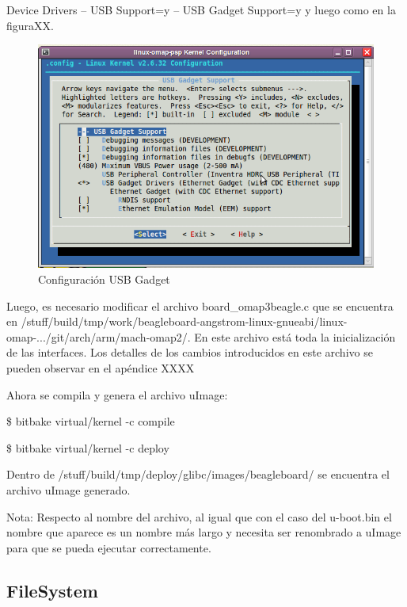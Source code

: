 Device Drivers – USB Support=y – USB Gadget Support=y y luego como en la figuraXX.

\begin{figure}[H]
\centering
  \begin{center}
  \includegraphics[scale=.4]{Imagenes/usb_chica.png} 
  \end{center}
  \caption{Configuración USB Gadget}\label{Fig:usb} 
\end{figure}

Luego, es necesario modificar el archivo board\_omap3beagle.c que se encuentra en /stuff/build/tmp/work/beagleboard-angstrom-linux-gnueabi/linux-omap-.../git/arch/arm/mach-omap2/. En este archivo está toda la inicialización de las interfaces. Los detalles de los cambios introducidos en este archivo se pueden observar en el apéndice XXXX

\bigskip
Ahora se compila y genera el archivo uImage:

\centerline{\$ bitbake virtual/kernel -c compile}

\centerline{\$ bitbake virtual/kernel -c deploy}

\bigskip
Dentro de /stuff/build/tmp/deploy/glibc/images/beagleboard/ se encuentra el archivo uImage generado.

\bigskip
Nota: Respecto al nombre del archivo, al igual que con el caso del u-boot.bin el nombre que aparece es un nombre más largo y necesita ser renombrado a uImage para que se pueda ejecutar correctamente.

\subsection{FileSystem}

